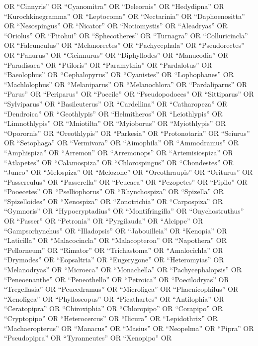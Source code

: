 \documentclass[
  number,
  review,
  onecolumn]{elsarticle}
\begin{document}
OR ``Cinnyris'' OR ``Cyanomitra'' OR ``Deleornis'' OR ``Hedydipna'' OR
``Kurochkinegramma'' OR ``Leptocoma'' OR ``Nectarinia'' OR
``Daphoenositta'' OR ``Nesospingus'' OR ``Nicator'' OR ``Notiomystis''
OR ``Aleadryas'' OR ``Oriolus'' OR ``Pitohui'' OR ``Sphecotheres'' OR
``Turnagra'' OR ``Colluricincla'' OR ``Falcunculus'' OR ``Melanorectes''
OR ``Pachycephala'' OR ``Pseudorectes'' OR ``Panurus'' OR ``Cicinnurus''
OR ``Diphyllodes'' OR ``Manucodia'' OR ``Paradisaea'' OR ``Ptiloris'' OR
``Paramythia'' OR ``Pardalotus'' OR ``Baeolophus'' OR ``Cephalopyrus''
OR ``Cyanistes'' OR ``Lophophanes'' OR ``Machlolophus'' OR
``Melaniparus'' OR ``Melanochlora'' OR ``Pardaliparus'' OR ``Parus'' OR
``Periparus'' OR ``Poecile'' OR ``Pseudopodoces'' OR ``Sittiparus'' OR
``Sylviparus'' OR ``Basileuterus'' OR ``Cardellina'' OR ``Catharopeza''
OR ``Dendroica'' OR ``Geothlypis'' OR ``Helmitheros'' OR ``Leiothlypis''
OR ``Limnothlypis'' OR ``Mniotilta'' OR ``Myioborus'' OR ``Myiothlypis''
OR ``Oporornis'' OR ``Oreothlypis'' OR ``Parkesia'' OR ``Protonotaria''
OR ``Seiurus'' OR ``Setophaga'' OR ``Vermivora'' OR ``Aimophila'' OR
``Ammodramus'' OR ``Amphispiza'' OR ``Arremon'' OR ``Arremonops'' OR
``Artemisiospiza'' OR ``Atlapetes'' OR ``Calamospiza'' OR
``Chlorospingus'' OR ``Chondestes'' OR ``Junco'' OR ``Melospiza'' OR
``Melozone'' OR ``Oreothraupis'' OR ``Oriturus'' OR ``Passerculus'' OR
``Passerella'' OR ``Peucaea'' OR ``Pezopetes'' OR ``Pipilo'' OR
``Pooecetes'' OR ``Pselliophorus'' OR ``Rhynchospiza'' OR ``Spizella''
OR ``Spizelloides'' OR ``Xenospiza'' OR ``Zonotrichia'' OR
``Carpospiza'' OR ``Gymnoris'' OR ``Hypocryptadius'' OR
``Montifringilla'' OR ``Onychostruthus'' OR ``Passer'' OR ``Petronia''
OR ``Pyrgilauda'' OR ``Alcippe'' OR ``Gampsorhynchus'' OR ``Illadopsis''
OR ``Jabouilleia'' OR ``Kenopia'' OR ``Laticilla'' OR ``Malacocincla''
OR ``Malacopteron'' OR ``Napothera'' OR ``Pellorneum'' OR ``Rimator'' OR
``Trichastoma'' OR ``Amalocichla'' OR ``Drymodes'' OR ``Eopsaltria'' OR
``Eugerygone'' OR ``Heteromyias'' OR ``Melanodryas'' OR ``Microeca'' OR
``Monachella'' OR ``Pachycephalopsis'' OR ``Peneoenanthe'' OR
``Peneothello'' OR ``Petroica'' OR ``Poecilodryas'' OR ``Tregellasia''
OR ``Peucedramus'' OR ``Microligea'' OR ``Phaenicophilus'' OR
``Xenoligea'' OR ``Phylloscopus'' OR ``Picathartes'' OR ``Antilophia''
OR ``Ceratopipra'' OR ``Chiroxiphia'' OR ``Chloropipo'' OR ``Corapipo''
OR ``Cryptopipo'' OR ``Heterocercus'' OR ``Ilicura'' OR ``Lepidothrix''
OR ``Machaeropterus'' OR ``Manacus'' OR ``Masius'' OR ``Neopelma'' OR
``Pipra'' OR ``Pseudopipra'' OR ``Tyranneutes'' OR ``Xenopipo'' OR
\end{document}
